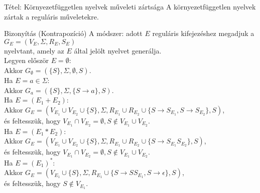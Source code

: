 \documentclass{beamer}
\begin{document}
\begin{frame}
\begin{block}{Tétel: Környezetfüggetlen nyelvek műveleti zártsága}
A környezetfüggetlen nyelvek zártak a reguláris műveletekre.
\end{block}

\begin{block}{Bizonyítás (Kontrapozíció)}
A módszer: adott $E$ reguláris kifejezéshez megadjuk a\\
$G_E = (V_E, {\Sigma}, R_E, S_E)$\\
nyelvtant, amely az $E$ által jelölt nyelvet generálja.\\
\bigskip
Legyen először $E = \emptyset$:\\
Akkor $G_{\emptyset} = (\{S\}, {\Sigma}, \emptyset, S)$.\\
\bigskip
Ha $E = a \in {\Sigma}$:\\
Akkor $G_a = (\{S\}, {\Sigma}, \{S \rightarrow a\}, S)$.\\
\bigskip
Ha $E = (E_1 + E_2)$:\\
Akkor $G_E = (V_{E_1} \cup V_{E_2} \cup \{S\}, \Sigma, R_{E_1} \cup R_{E_2} \cup \{S \rightarrow S_{E_1}, S \rightarrow S_{E_2}\}, S)$,\\
és feltesszük, hogy $V_{E_1} \cap V_{E_2} = {\emptyset}, S \notin V_{E_1} \cup V_{E_2}$.\\
\bigskip
Ha $E = (E_1 * E_2)$:\\
Akkor $G_E = (V_{E_1} \cup V_{E_2} \cup \{S\}, \Sigma, R_{E_1} \cup R_{E_2} \cup \{S \rightarrow S_{E_1}S_{E_2}\}, S)$,\\
és feltesszük, hogy $V_{E_1} \cap V_{E_2} = {\emptyset}, S \notin V_{E_1} \cup V_{E_2}$.\\
\bigskip
Ha $E = (E_1)^*$:\\
Akkor $G_E = (V_{E_1} \cup \{S\}, \Sigma, R_{E_1} \cup \{S \rightarrow SS_{E_1}, S \rightarrow \epsilon \}, S)$,\\
és feltesszük, hogy $S \notin V_{E_1}$.\\

\end{block}
\end{frame}
\end{document}
